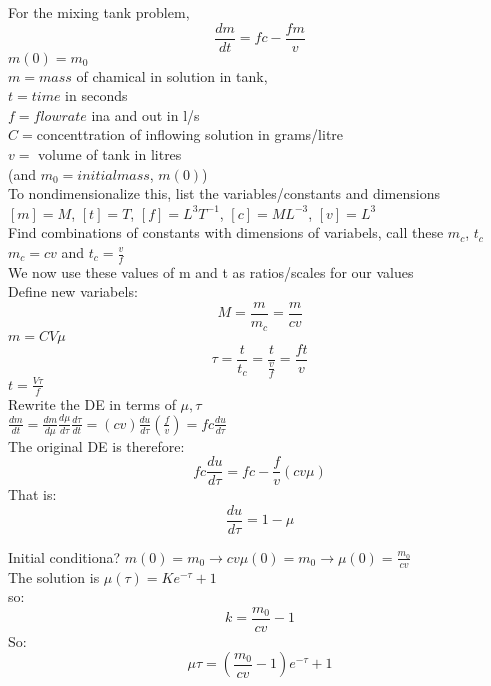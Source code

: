 \documentclass[12pt]{article}
\begin{document}
	For the mixing tank problem,\\
	$$\frac{dm}{dt} = fc - \frac{fm}{v}$$
	$m(0) = m_0$\\
	$m = mass$ of chamical in solution in tank,\\
	$t = time$ in seconds\\
	$f = flow rate$ ina and out in l/s\\
	$C = $concenttration of inflowing solution in grams/litre\\
	$v = $ volume of tank in litres\\
	(and $m_0 = initial mass$, $m(0)$)\\
	
	To nondimensionalize this, list the variables/constants and dimensions\\
	$[m] = M$, $[t] = T$, $[f] = L^3T^{-1}$, $[c] = ML^{-3}$, $[v] = L^3$\\
	
	Find combinations of constants with dimensions of variabels, call these $m_c$, $t_c$\\
	$m_c = cv$ and $t_c = \frac{v}{f}$\\
	
	We now use these values of m and t as ratios/scales for our values\\
	
	Define new variabels:\\
	$$M = \frac{m}{m_c} = \frac{m}{cv}$$
	$m = CV\mu$\\
	$$\tau = \frac{t}{t_c} = \frac{t}{\frac{v}{f}} = \frac{ft}{v}$$
	$t = \frac{V\tau}{f}$\\
	
	Rewrite the DE in terms of $\mu, \tau$\\
	$\frac{dm}{dt} = \frac{dm}{d\mu}\frac{d\mu}{d\tau}\frac{d\tau}{dt} = (cv)\frac{du}{d\tau}(\frac{f}{v}) = fc\frac{du}{d\tau}$\\
	
	The original DE is therefore:\\
	$$fc\frac{du}{d\tau} = fc - \frac{f}{v}(cv\mu)$$
	That is:\\
	$$\frac{du}{d\tau} = 1 - \mu$$
	
	Initial conditiona? $m(0) = m_0 \rightarrow cv\mu(0) = m_0 \rightarrow \mu(0) = \frac{m_0}{cv}$\\
	
	The solution is $\mu(\tau) = Ke^{-\tau} + 1$\\
	
	so:\\
	$$k = \frac{m_0}{cv} - 1$$
	So:
	$$\mu{\tau} = (\frac{m_0}{cv} - 1)e^{-\tau}  + 1$$
	
\end{document}
